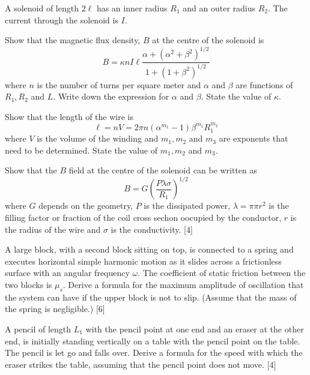 \begin{problem}
    A solenoid of length $2 \ell$ has an inner radius $R_{1}$ and an outer radius $R_{2}$. The current through the solenoid is $I$.
    \begin{subproblem}
        Show that the magnetic flux density, $B$ at the centre of the solenoid is
        \[B=\kappa n I \ell \frac{\alpha+\left(\alpha^{2}+\beta^{2}\right)^{1 / 2}}{1+\left(1+\beta^{2}\right)^{1 / 2}}\]
        where $n$ is the number of turns per square meter and $\alpha$ and $\beta$ are functions of $R_{1}, R_{2}$ and $L$. Write down the expression for $\alpha$ and $\beta$. State the value of $\kappa$.
    \end{subproblem}
    \begin{subproblem}
        Show that the length of the wire is
        \[\ell=n V=2 \pi n\left(\alpha^{m_{1}}-1\right) \beta^{m_{1}} R_{1}^{m_{2}}\]
        where $V$ is the volume of the winding and $m_{1}, m_{2}$ and $m_{3}$ are exponents that need to be determined. State the value of $m_{1}, m_{2}$ and $m_{3}$.
    \end{subproblem}
    \begin{subproblem}
        Show that the $B$ field at the centre of the solenoid can be written as
        \[B=G\left(\frac{P \lambda \sigma}{R_{1}}\right)^{1/2}\]
        where $G$ depends on the geometry, $P$ is the dissipated power, $\lambda=\pi \pi r^{2}$ is the filling factor or fraction of the coil cross sechon oocupied by the conductor, $r$ is the radius of the wire and $\sigma$ is the conductivity.
    \hfill{[4]}\end{subproblem}
\end{problem}

\begin{problem}
    \begin{subproblem}
        A large block, with a second block sitting on top, is connected to a spring and executes horizontal simple harmonic motion as it slides across a frictionless surface with an angular frequency $\omega$. The coefficient of static friction between the two blocks is $\mu_{s}$. Derive a formula for the maximum amplitude of oscillation that the system can have if the upper block is not to slip. (Assume that the mass of the spring is negligible.)
    \hfill{[6]}\end{subproblem}
    \begin{subproblem}
        A pencil of length $L_{1}$ with the pencil point at one end and an eraser at the other end, is initially standing vertically on a table with the pencil point on the table. The pencil is let go and falls over. Derive a formula for the speed with which the eraser strikes the table, assuming that the pencil point does not move.
    \hfill{[4]}\end{subproblem}
\end{problem}


